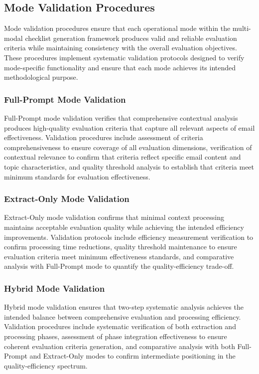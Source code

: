 \subsection{Mode Validation Procedures}

Mode validation procedures ensure that each operational mode within the multi-modal checklist generation framework produces valid and reliable evaluation criteria while maintaining consistency with the overall evaluation objectives. These procedures implement systematic validation protocols designed to verify mode-specific functionality and ensure that each mode achieves its intended methodological purpose.

\subsubsection{Full-Prompt Mode Validation}

Full-Prompt mode validation verifies that comprehensive contextual analysis produces high-quality evaluation criteria that capture all relevant aspects of email effectiveness. Validation procedures include assessment of criteria comprehensiveness to ensure coverage of all evaluation dimensions, verification of contextual relevance to confirm that criteria reflect specific email content and topic characteristics, and quality threshold analysis to establish that criteria meet minimum standards for evaluation effectiveness.

\subsubsection{Extract-Only Mode Validation}

Extract-Only mode validation confirms that minimal context processing maintains acceptable evaluation quality while achieving the intended efficiency improvements. Validation protocols include efficiency measurement verification to confirm processing time reductions, quality threshold maintenance to ensure evaluation criteria meet minimum effectiveness standards, and comparative analysis with Full-Prompt mode to quantify the quality-efficiency trade-off.

\subsubsection{Hybrid Mode Validation}

Hybrid mode validation ensures that two-step systematic analysis achieves the intended balance between comprehensive evaluation and processing efficiency. Validation procedures include systematic verification of both extraction and processing phases, assessment of phase integration effectiveness to ensure coherent evaluation criteria generation, and comparative analysis with both Full-Prompt and Extract-Only modes to confirm intermediate positioning in the quality-efficiency spectrum.

